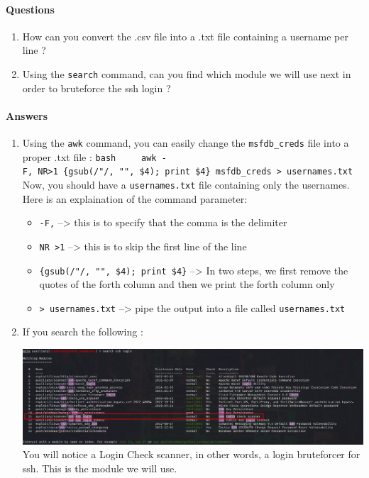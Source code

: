 \documentclass[a4paper,11pt,singlespacing]{article}
\providecommand{\tightlist}{%
  \setlength{\itemsep}{0pt}\setlength{\parskip}{0pt}}
\begin{document}
\paragraph{Questions}\label{questions-2}

\begin{enumerate}
\def\labelenumi{\arabic{enumi}.}
\tightlist
\item
  How can you convert the .csv file into a .txt file containing a
  username per line ?
\item
  Using the \texttt{search} command, can you find which module we will
  use next in order to bruteforce the ssh login ?
\end{enumerate}

\pagebreak

\paragraph{Answers}\label{answers-2}

\begin{enumerate}
\def\labelenumi{\arabic{enumi}.}
\item
  Using the \texttt{awk} command, you can easily change the
  \texttt{msfdb\_creds} file into a proper .txt file :
  \texttt{bash\ \ \ \ \ awk\ -F\textquotesingle{},\textquotesingle{}\ \textquotesingle{}NR\textgreater{}1\ \{gsub(/"/,\ "",\ \$4);\ print\ \$4\}\textquotesingle{}\ msfdb\_creds\ \textgreater{}\ usernames.txt}
  Now, you should have a \texttt{usernames.txt} file containing only the
  usernames. Here is an explaination of the command parameter:

  \begin{itemize}
  \tightlist
  \item
    \texttt{-F\textquotesingle{},\textquotesingle{}} --\textgreater{}
    this is to specify that the comma is the delimiter
  \item
    \texttt{NR\ \textgreater{}1} --\textgreater{} this is to skip the
    first line of the line
  \item
    \texttt{\{gsub(/"/,\ "",\ \$4);\ print\ \$4\}} --\textgreater{} In
    two steps, we first remove the quotes of the forth column and then
    we print the forth column only
  \item
    \texttt{\textgreater{}\ usernames.txt} --\textgreater{} pipe the
    output into a file called \texttt{usernames.txt}
  \end{itemize}
\item
  If you search the following :

  \includegraphics{./Images/Image02.png}
  You will notice a Login Check scanner, in other words, a login
  bruteforcer for ssh. This is the module we will use.
\end{enumerate}
\end{document}
